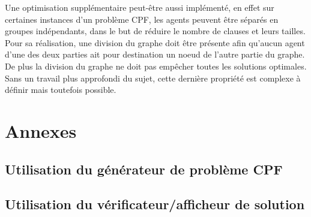 \documentclass[french, 12pt, letterpaper]{article}
\theoremstyle{definition}
\theoremstyle{proposition}
\theoremstyle{example}
\begin{document}
    Une optimisation supplémentaire peut-être aussi implémenté, en effet sur certaines instances d'un problème CPF, les agents peuvent
    être séparés en groupes indépendants, dans le but de réduire le nombre de clauses et leurs tailles.
    Pour sa réalisation, une division du graphe doit être présente afin qu'aucun agent d'une des deux parties ait pour destination
    un noeud de l'autre partie du graphe. De plus la division du graphe ne doit pas empêcher toutes les solutions optimales. 
    Sans un travail plus approfondi du sujet, cette dernière propriété est complexe à définir mais toutefois possible.
    
    \newpage
    

    \section*{Annexes}

    \subsection*{Utilisation du générateur de problème CPF}
    \label{anx:generator}
    \subsection*{Utilisation du vérificateur/afficheur de solution}
    \label{anx:verifier}
\end{document}
